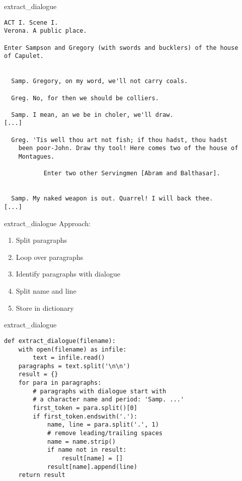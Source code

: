 \documentclass[aspectratio=169,usenames,dvipsnames]{beamer}
\begin{document}
\begin{frame}[fragile]{extract\_dialogue}
\scriptsize
\begin{verbatim}
ACT I. Scene I.
Verona. A public place.

Enter Sampson and Gregory (with swords and bucklers) of the house
of Capulet.


  Samp. Gregory, on my word, we'll not carry coals.

  Greg. No, for then we should be colliers.

  Samp. I mean, an we be in choler, we'll draw.
[...]

  Greg. 'Tis well thou art not fish; if thou hadst, thou hadst
    been poor-John. Draw thy tool! Here comes two of the house of
    Montagues.

           Enter two other Servingmen [Abram and Balthasar].


  Samp. My naked weapon is out. Quarrel! I will back thee.
[...]
\end{verbatim}
\end{frame}

\begin{frame}[fragile]{extract\_dialogue}
    Approach:
    \begin{enumerate}
        \item Split paragraphs
        \item Loop over paragraphs
        \item Identify paragraphs with dialogue
        \item Split name and line
        \item Store in dictionary
    \end{enumerate}
\end{frame}

\begin{frame}[fragile]{extract\_dialogue}
\begin{lstlisting}
def extract_dialogue(filename):
    with open(filename) as infile:
        text = infile.read()
    paragraphs = text.split('\n\n')
    result = {}
    for para in paragraphs:
        # paragraphs with dialogue start with
        # a character name and period: 'Samp. ...'
        first_token = para.split()[0]
        if first_token.endswith('.'):
            name, line = para.split('.', 1)
            # remove leading/trailing spaces
            name = name.strip()
            if name not in result:
                result[name] = []
            result[name].append(line)
    return result
\end{lstlisting}
\end{frame}
\end{document}
